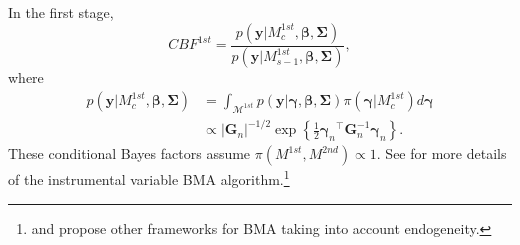 In the first stage,
\begin{equation*}
	CBF^{1st}=\frac{p(\bm{y}|M_{c}^{1st},\bm{\beta},\bm{\Sigma})}{p(\bm{y}|M_{s-1}^{1st},\bm{\beta},\bm{\Sigma})},
\end{equation*}
where \begin{align*}
	p(\bm{y}|M_{c}^{1st},\bm{\beta},\bm{\Sigma})&=\int_{\mathcal{M}^{1st}}p(\bm{y}|\bm{\gamma},\bm{\beta},\bm{\Sigma})\pi(\bm{\gamma}|M_{c}^{1st})d\bm{\gamma}\\
	&\propto |\bm{G}_n|^{-1/2} \exp\left\{\frac{1}{2}{\bm{\gamma}_n}^{\top}\bm{G}_n^{-1}\bm{\gamma}_n\right\}.
\end{align*}
These conditional Bayes factors assume $\pi(M^{1st},M^{2nd})\propto 1$. See \cite{Lenkoski2013} for more details of the instrumental variable BMA algorithm.\footnote{\cite{Koop12} and \cite{Lenkoski2014} propose other frameworks for BMA taking into account endogeneity.}

